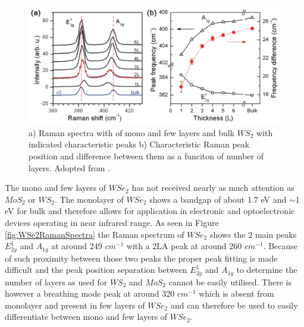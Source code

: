 \begin{figure}[ht]
	\begin{center}
		\includegraphics[scale=0.3]{NumberLayerIdentificationRamanMoS2.png}
		\caption{a) Raman spectra with of mono and few layers and bulk $WS_2$ with indicated characteristic peaks b) Characteristic Raman peak position and difference between them as a funciton of number of layers. Adopted from \cite{Lee2010}.}
		\label{fig:NumberLayerIdentificationRamanMoS2}
	\end{center}
\end{figure}

The mono and few layers of $WSe_2$ has not received nearly as much attention as $MoS_2$ or $WS_2$. The monolayer of $WSe_2$ shows a bandgap of about 1.7 eV \cite{Yun2012} and $\sim$1 eV for bulk and therefore allows for application in electronic and optoelectronic devices operating in near infrared range. As seen in Figure \ref{fig:WSe2RamanSpectra} the Raman spectrum of $WSe_2$ shows the 2 main peaks $E^1_{2g}$ and $A_{1g}$ at around 249 $cm^{-1}$ with a 2LA peak at around 260 $cm^{-1}$. Because of such proximity between those two peaks the proper peak fitting is made difficult and the peak position separation between $E^1_{2g}$ and $A_{1g}$ to determine the number of layers as used for $WS_2$ and $MoS_2$ cannot be easily utilised. There is however a breathing mode peak at around 320 $cm^{-1}$ which is absent from monolayer and present in few layers of $WSe_2$ and can therefore be used to easily differentiate between mono and few layers of $WSe_2$. 

